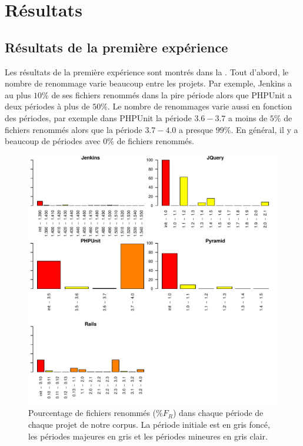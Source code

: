 \section{Résultats}
\label{sec:resultats}

\subsection{Résultats de la première expérience}

Les résultats de la première expérience sont montrés dans la . Tout d'abord, le nombre de renommage varie beaucoup entre les projets. Par exemple, Jenkins a au plus $10\%$ de ses fichiers renommés dans la pire période alors que PHPUnit a deux périodes à plus de $50\%$. Le nombre de renommages varie aussi en fonction des périodes, par exemple dans PHPUnit la période $3.6 - 3.7$ a moins de $5\%$ de fichiers renommés alors que la période $3.7 - 4.0$ a presque $99\%$. En général, il y a beaucoup de périodes avec $0\%$ de fichiers renommés.\\

\begin{figure}[t]
	\centering
	\includegraphics[width=0.85\linewidth,keepaspectratio]{data/figures/renaming.pdf}
	\caption{Pourcentage de fichiers renommés ($\%F_R$) dans chaque période de chaque projet de notre corpus. La période initiale est en gris foncé, les périodes majeures en gris et les périodes mineures en gris clair.}
	\label{fig:renaming}
\end{figure}

